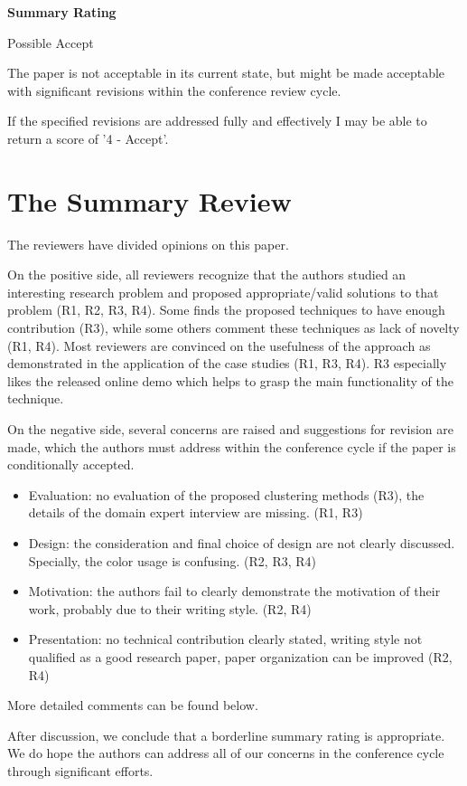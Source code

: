 \documentclass{article}
\begin{document}
\textbf{Summary Rating}

    Possible Accept
    
    The paper is not acceptable in its current state, but might be made
    acceptable with significant revisions within the conference review cycle.
    
    If the specified revisions are addressed fully and effectively I may be able
    to return a score of '4 - Accept'.

\section{The Summary Review}
    The reviewers have divided opinions on this paper.

    On the positive side, all reviewers recognize that the authors studied an
    interesting research problem and proposed appropriate/valid solutions to
    that problem (R1, R2, R3, R4). Some finds the proposed techniques to have
    enough contribution (R3), while some others comment these techniques as lack
    of novelty (R1, R4). Most reviewers are convinced on the usefulness of the
    approach as demonstrated in the application of the case studies (R1, R3,
    R4). R3 especially likes the released online demo which helps to grasp the
    main functionality of the technique.

    On the negative side, several concerns are raised and suggestions for
    revision are made, which the authors must address within the conference
    cycle if the paper is conditionally accepted.

    \begin{itemize}
    \item{Evaluation: no evaluation of the proposed clustering methods (R3), the details
    of the domain expert interview are missing. (R1, R3)}

    \item{Design: the consideration and final choice of design are not clearly discussed.
    Specially, the color usage is confusing. (R2, R3, R4)}

    \item{Motivation: the authors fail to clearly demonstrate the motivation of their
    work, probably due to their writing style. (R2, R4)}

    \item{Presentation: no technical contribution clearly stated, writing style not
    qualified as a good research paper, paper organization can be improved (R2, R4)}
    \end{itemize}

    More detailed comments can be found below.

    After discussion, we conclude that a borderline summary rating is appropriate. We
    do hope the authors can address all of our concerns in the conference cycle
    through significant efforts.
\end{document}
